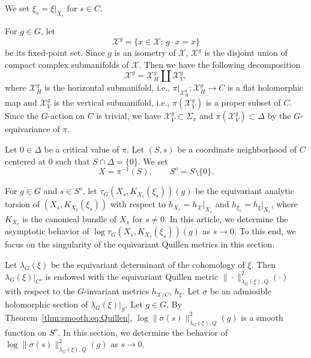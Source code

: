 \documentclass[amscd, leqno]{amsart}
\theoremstyle{plain}
\theoremstyle{definition}
\theoremstyle{remark}
\begin{document}
We set $\xi_{s}=\xi|_{X_{s}}$ for $s\in C$.
\par
For $g\in G$, let 
$$
{\mathcal X}^{g}=\{x\in{\mathcal X};\,g\cdot x=x\}
$$ 
be its fixed-point set. Since $g$ is an isometry of ${\mathcal X}$, ${\mathcal X}^{g}$ is the disjoint union of compact complex submanifolds of ${\mathcal X}$. Then we have the following decomposition
$$
{\mathcal X}^{g}={\mathcal X}^{g}_{H}\amalg{\mathcal X}^{g}_{V},
$$
where ${\mathcal X}^{g}_{H}$ is the horizontal submanifold, i.e., $\pi|_{{\mathcal X}^{g}_{H}}\colon{\mathcal X}^{g}_{H}\to C$ is a flat holomorphic map and ${\mathcal X}^{g}_{V}$ is the vertical submanifold, i.e., $\pi({\mathcal X}_{V}^{g})$ is a proper subset of $C$. 
Since the $G$-action on $C$ is trivial, we have ${\mathcal X}^{g}_{V}\subset\Sigma_{\pi}$ and $\pi({\mathcal X}^{g}_{V})\subset\Delta$ by the $G$-equivariance of $\pi$.
\par
Let $0\in\Delta$ be a critical value of $\pi$. Let $(S,s)$ be a coordinate neighborhood of $C$ centered at $0$ such that $S \cap\Delta=\{0\}$. 
We set 
$$
X=\pi^{-1}(S),
\qquad
S^{o}=S\setminus\{0\}.
$$
\par
For $g\in G$ and $s\in S^{o}$, let $\tau_{G}(X_{s}, K_{X_{s}}(\xi_{s}))(g)$
be the equivariant analytic torsion of $(X_{s}, K_{X_{s}}(\xi_{s}))$ with respect to $h_{X_{s}}=h_{\mathcal X}|_{X_{s}}$ and 
$h_{\xi_{s}}=h_{\xi}|_{X_{s}}$, where $K_{X_{s}}$ is the canonical bundle of $X_{s}$ for $s\not=0$. 
In this article, we determine the asymptotic behavior of $\log \tau_{G}(X_{s}, K_{X_{s}}(\xi_{s}))(g)$ as $s \to 0$. 
To this end, we focus on the singularity of the equivariant Quillen metrics in this section.



\par
Let $\lambda_{G}(\xi)$ be the equivariant determinant of the cohomology of $\xi$. 
Then $\lambda_{G}(\xi)|_{C^{o}}$ is endowed with the equivariant Quillen metric $\|\cdot\|^{2}_{\lambda_{G}(\xi),Q}(\cdot)$ with respect to 
the $G$-invariant metrics $h_{{\mathcal X}/C}$, $h_{\xi}$. Let $\sigma$ be an admissible holomorphic section of $\lambda_{G}(\xi)|_{S}$. 
Let $g \in G$. By Theorem~\ref{thm:smooth:eq:Quillen}, $\log\|\sigma(s)\|^{2}_{\lambda_{G}(\xi),Q}(g)$ is a smooth function on $S^{o}$. 
In this section, we determine the behavior of $\log\|\sigma(s)\|^{2}_{\lambda_{G}(\xi),Q}(g)$ as $s\to0$.




\end{document}
